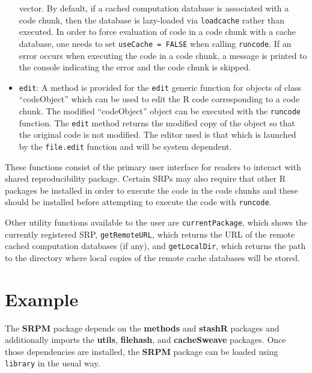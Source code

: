 \documentclass{article}
\newcommand{\proglang}{\textsf}
\newcommand{\code}{\texttt}
\newcommand{\pkg}{\textbf}
\begin{document}
\begin{itemize}
vector.  By default, if a cached computation database is associated
with a code chunk, then the database is lazy-loaded via
\code{loadcache} rather than executed.  In order to force evaluation
of code in a code chunk with a cache database, one needs to set
\code{useCache = FALSE} when calling \code{runcode}.  If an error
occurs when executing the code in a code chunk, a message is printed
to the console indicating the error and the code chunk is skipped.
\item
\code{edit}: A method is provided for the \code{edit} generic function
for objects of class ``codeObject'' which can be used to edit the
\proglang{R} code corresponding to a code chunk.  The modified
``codeObject'' object can be executed with the \code{runcode}
function.  The \code{edit} method returns the modified copy of the
object so that the original code is not modified.  The editor used is
that which is launched by the \code{file.edit} function and will be
system dependent.
\end{itemize}

These functions consist of the primary user interface for readers to
interact with shared reproducibility package.  Certain SRPs may also
require that other \proglang{R} packages be installed in order to
execute the code in the code chunks and these should be installed
before attempting to execute the code with \code{runcode}.

Other utility functions available to the user are
\code{currentPackage}, which shows the currently registered SRP,
\code{getRemoteURL}, which returns the URL of the remote cached
computation databases (if any), and \code{getLocalDir}, which returns
the path to the directory where local copies of the remote cache
databases will be stored.







\section{Example}
\label{sec:example}

The \pkg{SRPM} package depends on the \pkg{methods} and \pkg{stashR}
packages and additionally imports the \pkg{utils}, \pkg{filehash}, and
\pkg{cacheSweave} packages.  Once those dependencies are installed,
the \pkg{SRPM} package can be loaded using \code{library} in the usual
way.
\end{document}
